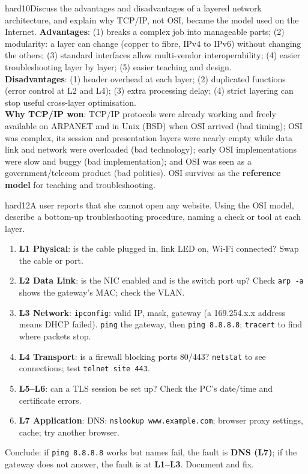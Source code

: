 \documentclass[10pt]{article}
\begin{document}
\begin{practice}{hard}{10}Discuss the advantages and disadvantages of a layered network architecture, and explain why TCP/IP, not OSI, became the model used on the Internet.
\sol
\textbf{Advantages}: (1) breaks a complex job into manageable parts; (2) modularity: a layer can change (copper to fibre, IPv4 to IPv6) without changing the others; (3) standard interfaces allow multi-vendor interoperability; (4) easier troubleshooting layer by layer; (5) easier teaching and design.\\
\textbf{Disadvantages}: (1) header overhead at each layer; (2) duplicated functions (error control at L2 and L4); (3) extra processing delay; (4) strict layering can stop useful cross-layer optimisation.\\
\textbf{Why TCP/IP won}: TCP/IP protocols were already working and freely available on ARPANET and in Unix (BSD) when OSI arrived (bad timing); OSI was complex, its session and presentation layers were nearly empty while data link and network were overloaded (bad technology); early OSI implementations were slow and buggy (bad implementation); and OSI was seen as a government/telecom product (bad politics). OSI survives as the \textbf{reference model} for teaching and troubleshooting.
\end{practice}

\begin{practice}{hard}{12}A user reports that she cannot open any website. Using the OSI model, describe a bottom-up troubleshooting procedure, naming a check or tool at each layer.
\sol
\begin{enumerate}
\item \textbf{L1 Physical}: is the cable plugged in, link LED on, Wi-Fi connected? Swap the cable or port.
\item \textbf{L2 Data Link}: is the NIC enabled and is the switch port up? Check \texttt{arp -a} shows the gateway's MAC; check the VLAN.
\item \textbf{L3 Network}: \texttt{ipconfig}: valid IP, mask, gateway (a 169.254.x.x address means DHCP failed). \texttt{ping} the gateway, then \texttt{ping 8.8.8.8}; \texttt{tracert} to find where packets stop.
\item \textbf{L4 Transport}: is a firewall blocking ports 80/443? \texttt{netstat} to see connections; test \texttt{telnet site 443}.
\item \textbf{L5--L6}: can a TLS session be set up? Check the PC's date/time and certificate errors.
\item \textbf{L7 Application}: DNS: \texttt{nslookup www.example.com}; browser proxy settings, cache; try another browser.
\end{enumerate}
Conclude: if \texttt{ping 8.8.8.8} works but names fail, the fault is \textbf{DNS (L7)}; if the gateway does not answer, the fault is at \textbf{L1--L3}. Document and fix.
\end{practice}
\end{document}
